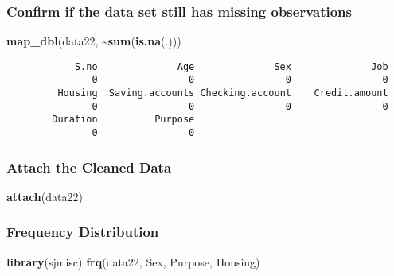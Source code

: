 \documentclass[
]{article}
\newenvironment{Shaded}{\begin{snugshade}}{\end{snugshade}}
\newcommand{\FunctionTok}[1]{\textcolor[rgb]{0.13,0.29,0.53}{\textbf{#1}}}
\newcommand{\NormalTok}[1]{#1}
\newcommand{\SpecialCharTok}[1]{\textcolor[rgb]{0.81,0.36,0.00}{\textbf{#1}}}
\begin{document}
\hypertarget{confirm-if-the-data-set-still-has-missing-observations}{%
\subsubsection{Confirm if the data set still has missing
observations}\label{confirm-if-the-data-set-still-has-missing-observations}}

\begin{Shaded}
\begin{Highlighting}[]
\FunctionTok{map\_dbl}\NormalTok{(data22, }\SpecialCharTok{\textasciitilde{}}\FunctionTok{sum}\NormalTok{(}\FunctionTok{is.na}\NormalTok{(.)))}
\end{Highlighting}
\end{Shaded}

\begin{verbatim}
            S.no              Age              Sex              Job 
               0                0                0                0 
         Housing  Saving.accounts Checking.account    Credit.amount 
               0                0                0                0 
        Duration          Purpose 
               0                0 
\end{verbatim}

\hypertarget{attach-the-cleaned-data}{%
\subsubsection{Attach the Cleaned Data}\label{attach-the-cleaned-data}}

\begin{Shaded}
\begin{Highlighting}[]
\FunctionTok{attach}\NormalTok{(data22)}
\end{Highlighting}
\end{Shaded}

\hypertarget{frequency-distribution}{%
\subsubsection{Frequency Distribution}\label{frequency-distribution}}

\begin{Shaded}
\begin{Highlighting}[]
\FunctionTok{library}\NormalTok{(sjmisc)}
\FunctionTok{frq}\NormalTok{(data22, Sex, Purpose, Housing)}
\end{Highlighting}
\end{Shaded}
\end{document}
